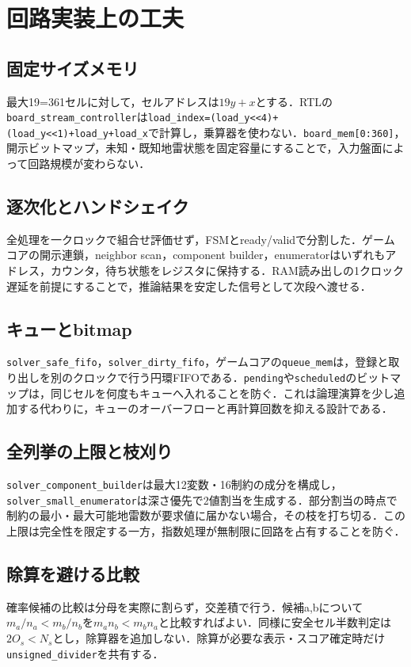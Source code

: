 \chapter{回路実装上の工夫}
\label{chap:implementation}

\section{固定サイズメモリ}
最大19=361セルに対して，セルアドレスは\(19y+x\)とする．RTLの\texttt{board\_stream\_controller}は\texttt{load\_index=(load\_y<<4)+(load\_y<<1)+load\_y+load\_x}で計算し，乗算器を使わない．\texttt{board\_mem[0:360]}，開示ビットマップ，未知・既知地雷状態を固定容量にすることで，入力盤面によって回路規模が変わらない．

\section{逐次化とハンドシェイク}
全処理を一クロックで組合せ評価せず，FSMとready/validで分割した．ゲームコアの開示連鎖，neighbor scan，component builder，enumeratorはいずれもアドレス，カウンタ，待ち状態をレジスタに保持する．RAM読み出しの1クロック遅延を前提にすることで，推論結果を安定した信号として次段へ渡せる．

\section{キューとbitmap}
\texttt{solver\_safe\_fifo}，\texttt{solver\_dirty\_fifo}，ゲームコアの\texttt{queue\_mem}は，登録と取り出しを別のクロックで行う円環FIFOである．\texttt{pending}や\texttt{scheduled}のビットマップは，同じセルを何度もキューへ入れることを防ぐ．これは論理演算を少し追加する代わりに，キューのオーバーフローと再計算回数を抑える設計である．

\section{全列挙の上限と枝刈り}
\texttt{solver\_component\_builder}は最大12変数・16制約の成分を構成し，\texttt{solver\_small\_enumerator}は深さ優先で2値割当を生成する．部分割当の時点で制約の最小・最大可能地雷数が要求値に届かない場合，その枝を打ち切る．この上限は完全性を限定する一方，指数処理が無制限に回路を占有することを防ぐ．

\section{除算を避ける比較}
確率候補の比較は分母を実際に割らず，交差積で行う．候補a,bについて\(m_a/n_a<m_b/n_b\)を\(m_an_b<m_bn_a\)と比較すればよい．同様に安全セル半数判定は\(2O_s<N_s\)とし，除算器を追加しない．除算が必要な表示・スコア確定時だけ\texttt{unsigned\_divider}を共有する．

